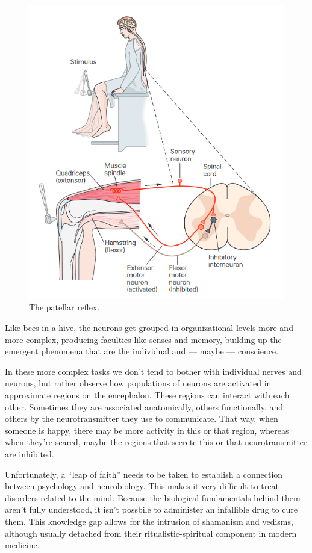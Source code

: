 \begin{figure}[H]
	\centering
	\includegraphics[width=.8\linewidth]{media/7-sn.png}
	\caption{The patellar reflex.}
	\label{sn}
\end{figure}

Like bees in a hive, the neurons get grouped in organizational levels more and more complex, producing faculties like senses and memory, building up the emergent phenomena that are the individual and --- maybe --- conscience.

In these more complex tasks we don't tend to bother with individual nerves and neurons, but rather observe how populations of neurons are activated in approximate regions on the encephalon. These regions can interact with each other. Sometimes they are associated anatomically, others functionally, and others by the neurotransmitter they use to communicate. That way, when someone is happy, there may be more activity in this or that region, whereas when they're scared, maybe the regions that secrete this or that neurotransmitter are inhibited.

Unfortunately, a \enquote{leap of faith} needs to be taken to establish a connection between psychology and neurobiology. This makes it very difficult to treat disorders related to the mind. Because the biological fundamentals behind them aren't fully understood, it isn't possbile to administer an infallible drug to cure them. This knowledge gap allows for the intrusion of shamanism and vedisms, although usually detached from their ritualistic-spiritual component in modern medicine.

\newpage
